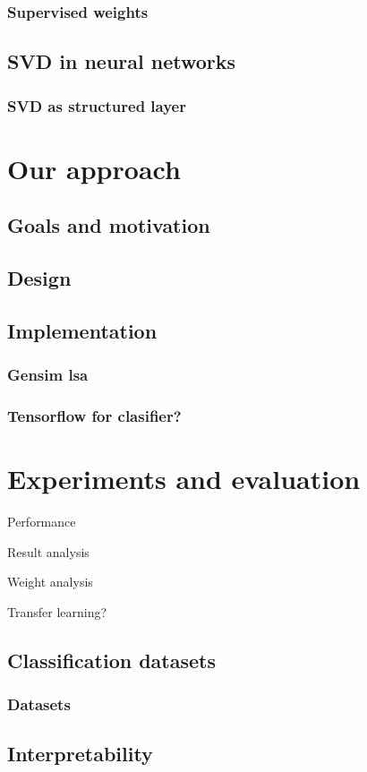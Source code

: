         \subsection{Supervised weights}
            \cite{wu2017balancing} %
            \cite{ji2013discriminative} %
            \cite{deng2014study} %
            \cite{lan2009supervised} %

    
    \section{SVD in neural networks}
        \subsection{SVD as structured layer} 
            \cite{ionescu2015training} %

    
\chapter{Our approach}
    \section{Goals and motivation}
    \section{Design}
    \section{Implementation}
        \cite{bird2009natural} %
        \subsection{Gensim lsa}
        \subsection{Tensorflow for clasifier?}
    \*

\chapter{Experiments and evaluation}

    Performance
    
    Result analysis
    
    Weight analysis
    
    Transfer learning?

    \section{Classification datasets}
        \subsection{Datasets}
            \cite{conneau2017supervised} %

    \section{Interpretability}
        \cite{ribeiro2016should} %


